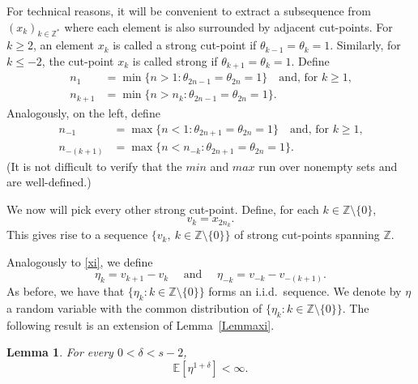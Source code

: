 \documentclass[a4paper,oneside,12pt]{amsart}
\renewcommand{\leq}{\leqslant}
\renewcommand{\geq}{\geqslant}
\newcommand{\E}{\mathbb{E}}
\theoremstyle{plain}
\newtheorem{lemma}{Lemma}
\theoremstyle{definition}
\theoremstyle{remark}
\begin{document}
For technical reasons, it will be convenient to extract a subsequence from  $(x_k)_{k\in \mathbb{Z}^\ast}$ where each element is also surrounded by adjacent cut-points.
For $k \geq 2$, an element $x_k$ is called a strong cut-point if $\theta_{k-1} = \theta_{k} = 1$. 
Similarly, for $k \leq  -2$, the cut-point $x_k$  is called strong if $\theta_{k+1} = \theta_{k} = 1$. 
Define  
\begin{equation*} 
\begin{split}
n_{1} &= \min\{ n > 1 \colon \theta_{2n-1} = \theta_{2n} = 1 \}
\quad \textrm{and, for $k\geq 1$,} \\
n_{k+1} &= \min\{ n > n_{k} \colon \theta_{2n-1} = \theta_{2n} = 1 \}.
\end{split}
\end{equation*}
Analogously, on the left, define
\begin{equation*} 
\begin{split}
n_{-1} &= \max\{ n < 1 \colon \theta_{2n+1} = \theta_{2n} = 1  \}
\quad \textrm{and, for $k\geq 1$,} \\
n_{-(k+1)} &= \max\{ n < n_{-k}  \colon \theta_{2n+1} = \theta_{2n} = 1 \}.
\end{split}
\end{equation*}
(It is not difficult to verify that the $min$ and $max$ run over nonempty sets and are well-defined.)

We now will pick every other strong cut-point. 
Define, for each $k \in \mathbb{Z} \setminus \{0\}$, 
\begin{equation}
v_k = x_{2n_{k}}.
\end{equation}
This gives rise to a sequence $\{ v_k, ~ k \in \mathbb{Z} \setminus \{0\}\}$ of strong cut-points spanning $\mathbb{Z}$. 

Analogously to \eqref{xi}, we define
\begin{equation}
\label{eta}
\eta_k = v_{k+1} - v_{k} \quad \textrm{ and } \quad \eta_{-k} = v_{-k} - v_{-(k+1)}.
\end{equation} 
As before, we have that $\{\eta_k \colon k\in \mathbb{Z} \setminus \{0\}\}$ forms an i.i.d.\ sequence.
We denote by $\eta$ a random variable with the common distribution of $\{\eta_k \colon k\in \mathbb{Z} \setminus \{0\}\}$.
The following result is an extension of Lemma~\ref{Lemmaxi}. 
\begin{lemma}
\label{Lemmaeta}
For every $0 < \delta < s-2$,
\begin{equation*}
\E\left[\eta^{1+\delta}\right] < \infty.
\end{equation*}
\end{lemma} 
\end{document}
